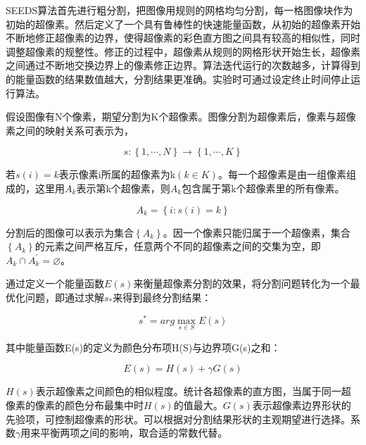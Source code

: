 \documentclass[nomlist,masters]{seuthesix}
\begin{document}
SEEDS算法\cite{Bergh2012SEEDS}首先进行粗分割，把图像用规则的网格均匀分割，每一格图像块作为初始的超像素。然后定义了一个具有鲁棒性的快速能量函数，从初始的超像素开始不断地修正超像素的边界，使得超像素的彩色直方图之间具有较高的相似性，同时调整超像素的规整性。修正的过程中，超像素从规则的网格形状开始生长，超像素之间通过不断地交换边界上的像素修正边界。算法迭代运行的次数越多，计算得到的能量函数的结果数值越大，分割结果更准确。实验时可通过设定终止时间停止运行算法。

假设图像有N个像素，期望分割为K个超像素。图像分割为超像素后，像素与超像素之间的映射关系可表示为，

\begin{equation}
s:\left \{ 1,\cdots, N \right \}\rightarrow \left \{ 1,\cdots ,K \right \}
\label{SEEDSmap}
\end{equation}

若$s(i)=k$表示像素i所属的超像素为k$(k\in K)$。每一个超像素是由一组像素组成的，这里用$A_{k}$表示第k个超像素，则$A_{k}$包含属于第k个超像素里的所有像素。

\begin{equation}
A_{k}=\left \{ i:s(i)=k \right \}
\label{SEEDSAk}
\end{equation}

分割后的图像可以表示为集合$\left \{ A_{k} \right \}$。因一个像素只能归属于一个超像素，集合$\left \{ A_{k} \right \}$的元素之间严格互斥，任意两个不同的超像素之间的交集为空，即$A_{k}\cap A_{k}^{'}=\varnothing $。

通过定义一个能量函数$E(s)$来衡量超像素分割的效果，将分割问题转化为一个最优化问题，即通过求解$s_{*}$来得到最终分割结果：

\begin{equation}
s^{*}=arg \max_{s\in S}E(s)
\label{SEEDSs}
\end{equation}

其中能量函数E(s)的定义为颜色分布项H(S)与边界项G(s)之和：

\begin{equation}
E(s)=H(s)+\gamma G(s)
\label{SEEDSE}
\end{equation}

$H(s)$表示超像素之间颜色的相似程度。统计各超像素的直方图，当属于同一超像素的像素的颜色分布最集中时$H(s)$的值最大。$G(s)$表示超像素边界形状的先验项，可控制超像素的形状。可以根据对分割结果形状的主观期望进行选择。系数$\gamma$用来平衡两项之间的影响，取合适的常数代替。
\end{document}
